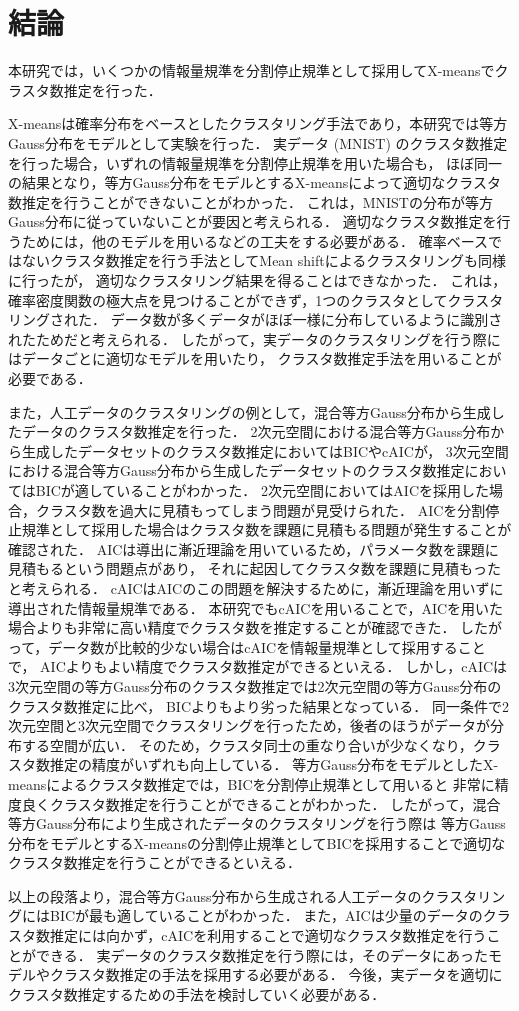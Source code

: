 \section{結論}

本研究では，いくつかの情報量規準を分割停止規準として採用してX-meansでクラスタ数推定を行った．

X-meansは確率分布をベースとしたクラスタリング手法であり，本研究では等方Gauss分布をモデルとして実験を行った．
実データ (MNIST) のクラスタ数推定を行った場合，いずれの情報量規準を分割停止規準を用いた場合も，
ほぼ同一の結果となり，等方Gauss分布をモデルとするX-meansによって適切なクラスタ数推定を行うことができないことがわかった．
これは，MNISTの分布が等方Gauss分布に従っていないことが要因と考えられる．
適切なクラスタ数推定を行うためには，他のモデルを用いるなどの工夫をする必要がある．
確率ベースではないクラスタ数推定を行う手法としてMean shiftによるクラスタリングも同様に行ったが，
適切なクラスタリング結果を得ることはできなかった．
これは，確率密度関数の極大点を見つけることができず，1つのクラスタとしてクラスタリングされた．
データ数が多くデータがほぼ一様に分布しているように識別されたためだと考えられる．
したがって，実データのクラスタリングを行う際にはデータごとに適切なモデルを用いたり，
クラスタ数推定手法を用いることが必要である．

また，人工データのクラスタリングの例として，混合等方Gauss分布から生成したデータのクラスタ数推定を行った．
2次元空間における混合等方Gauss分布から生成したデータセットのクラスタ数推定においてはBICやcAICが，
3次元空間における混合等方Gauss分布から生成したデータセットのクラスタ数推定においてはBICが適していることがわかった．
2次元空間においてはAICを採用した場合，クラスタ数を過大に見積もってしまう問題が見受けられた．
AICを分割停止規準として採用した場合はクラスタ数を課題に見積もる問題が発生することが確認された．
AICは導出に漸近理論を用いているため，パラメータ数を課題に見積もるという問題点があり，
それに起因してクラスタ数を課題に見積もったと考えられる．
cAICはAICのこの問題を解決するために，漸近理論を用いずに導出された情報量規準である．
本研究でもcAICを用いることで，AICを用いた場合よりも非常に高い精度でクラスタ数を推定することが確認できた．
したがって，データ数が比較的少ない場合はcAICを情報量規準として採用することで，
AICよりもよい精度でクラスタ数推定ができるといえる．
しかし，cAICは3次元空間の等方Gauss分布のクラスタ数推定では2次元空間の等方Gauss分布のクラスタ数推定に比べ，
BICよりもより劣った結果となっている．
同一条件で2次元空間と3次元空間でクラスタリングを行ったため，後者のほうがデータが分布する空間が広い．
そのため，クラスタ同士の重なり合いが少なくなり，クラスタ数推定の精度がいずれも向上している．
等方Gauss分布をモデルとしたX-meansによるクラスタ数推定では，BICを分割停止規準として用いると
非常に精度良くクラスタ数推定を行うことができることがわかった．
したがって，混合等方Gauss分布により生成されたデータのクラスタリングを行う際は
等方Gauss分布をモデルとするX-meansの分割停止規準としてBICを採用することで適切なクラスタ数推定を行うことができるといえる．

以上の段落より，混合等方Gauss分布から生成される人工データのクラスタリングにはBICが最も適していることがわかった．
また，AICは少量のデータのクラスタ数推定には向かず，cAICを利用することで適切なクラスタ数推定を行うことができる．
実データのクラスタ数推定を行う際には，そのデータにあったモデルやクラスタ数推定の手法を採用する必要がある．
今後，実データを適切にクラスタ数推定するための手法を検討していく必要がある．
